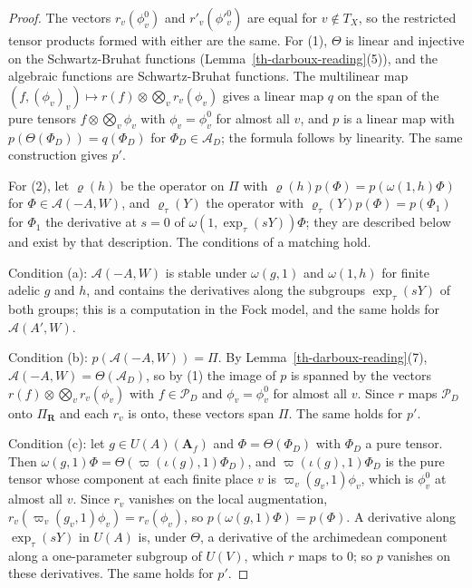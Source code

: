 \begin{proof}
The vectors $r_v(\phi^0_v)$ and $r'_v(\phi'^0_v)$ are equal for
$v\notin T_X$, so the restricted tensor products formed with either are the
same. For (1), $\Theta$ is linear and injective on the Schwartz-Bruhat
functions (Lemma~\ref{th-darboux-reading}(5)), and the algebraic functions are
Schwartz-Bruhat functions. The multilinear map
$(f,(\phi_v)_v)\mapsto r(f)\otimes\bigotimes_vr_v(\phi_v)$ gives a linear map
$q$ on the span of the pure tensors $f\otimes\bigotimes_v\phi_v$ with
$\phi_v=\phi^0_v$ for almost all $v$, and $p$ is a linear map with
$p(\Theta(\Phi_D))=q(\Phi_D)$ for $\Phi_D\in\mathcal A_D$; the formula follows
by linearity. The same construction gives $p'$.

For (2), let $\varrho(h)$ be the operator on $\Pi$ with
$\varrho(h)p(\Phi)=p(\omega(1,h)\Phi)$ for $\Phi\in\mathcal A(-A,W)$, and
$\varrho_\tau(Y)$ the operator with $\varrho_\tau(Y)p(\Phi)=p(\Phi_1)$ for
$\Phi_1$ the derivative at $s=0$ of $\omega(1,\exp_\tau(sY))\Phi$; they are
described below and exist by that description. The conditions of a matching
hold.

Condition (a): $\mathcal A(-A,W)$ is stable under $\omega(g,1)$ and
$\omega(1,h)$ for finite adelic $g$ and $h$, and contains the derivatives
along the subgroups $\exp_\tau(sY)$ of both groups; this is a computation in
the Fock model, and the same holds for $\mathcal A(A',W)$.

Condition (b): $p(\mathcal A(-A,W))=\Pi$. By
Lemma~\ref{th-darboux-reading}(7), $\mathcal A(-A,W)=\Theta(\mathcal A_D)$, so
by (1) the image of $p$ is spanned by the vectors
$r(f)\otimes\bigotimes_vr_v(\phi_v)$ with $f\in\mathcal P_D$ and
$\phi_v=\phi^0_v$ for almost all $v$. Since $r$ maps $\mathcal P_D$ onto
$\Pi_{\mathbf R}$ and each $r_v$ is onto, these vectors span $\Pi$. The same
holds for $p'$.

Condition (c): let $g\in U(A)(\mathbf A_f)$ and $\Phi=\Theta(\Phi_D)$ with
$\Phi_D$ a pure tensor. Then
$\omega(g,1)\Phi=\Theta(\varpi(\iota(g),1)\Phi_D)$, and
$\varpi(\iota(g),1)\Phi_D$ is the pure tensor whose component at each finite
place $v$ is $\varpi_v(g_v,1)\phi_v$, which is $\phi^0_v$ at almost all $v$.
Since $r_v$ vanishes on the local augmentation,
$r_v(\varpi_v(g_v,1)\phi_v)=r_v(\phi_v)$, so
$p(\omega(g,1)\Phi)=p(\Phi)$. A derivative along $\exp_\tau(sY)$ in $U(A)$
is, under $\Theta$, a derivative of the archimedean component along a
one-parameter subgroup of $U(V)$, which $r$ maps to $0$; so $p$ vanishes on
these derivatives. The same holds for $p'$.


\end{proof}
